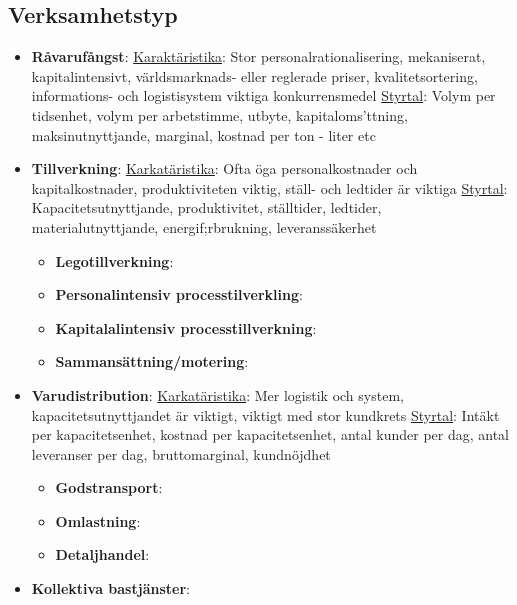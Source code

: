 \begin{multicols}{2}
\subsection{Verksamhetstyp}
\begin{itemize}
    \item \textbf{Råvarufångst}: \newline
    \underline{Karaktäristika}:
    Stor personalrationalisering, mekaniserat, kapitalintensivt, världsmarknads- eller reglerade priser, kvalitetsortering, informations- och logistisystem viktiga konkurrensmedel \newline
    \underline{Styrtal}:
    Volym per tidsenhet, volym per arbetstimme, utbyte, kapitaloms'ttning, maksinutnyttjande, marginal, kostnad per ton - liter etc
    \item \textbf{Tillverkning}: \newline
    \underline{Karkatäristika}:
    Ofta öga personalkostnader och kapitalkostnader, produktiviteten viktig, ställ- och ledtider är viktiga \newline
    \underline{Styrtal}:
    Kapacitetsutnyttjande, produktivitet, ställtider, ledtider, materialutnyttjande, energif;rbrukning, leveranssäkerhet
    \begin{itemize}
        \item \textbf{Legotillverkning}:
        \item \textbf{Personalintensiv processtilverkling}:
        \item \textbf{Kapitalalintensiv processtillverkning}:
        \item \textbf{Sammansättning/motering}:
    \end{itemize}
    \item \textbf{Varudistribution}: \newline
    \underline{Karkatäristika}:
    Mer logistik och system, kapacitetsutnyttjandet är viktigt, viktigt med stor kundkrets \newline
    \underline{Styrtal}:
    Intäkt per kapacitetsenhet, kostnad per kapacitetsenhet, antal kunder per dag, antal leveranser per dag, bruttomarginal, kundnöjdhet
    \begin{itemize}
        \item \textbf{Godstransport}:
        \item \textbf{Omlastning}:
        \item \textbf{Detaljhandel}:
    \end{itemize}
    \item \textbf{Kollektiva bastjänster}: \newline

\end{itemize}
\end{multicols}
